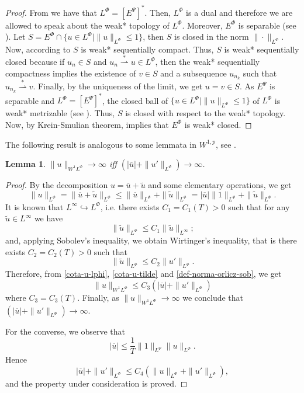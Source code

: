 \documentclass[twoside]{elsarticle}
\newtheorem{lem}[thm]{Lemma}
\theoremstyle{remark}
\newcommand{\orlnor}{\|_{L^{\Phi}}}
\newcommand{\lphi}{L^{\Phi}}
\newcommand{\lpsi}{L^{\Psi}}
\newcommand{\ephi}{E^{\Phi}}
\newcommand{\sobnor}{\|_{W^{1}\lphi}}
\renewcommand{\leq}{\leqslant}
\newcommand{\epsi}{E^{\Psi}}
\begin{document}
\begin{proof}
From \cite[Thm. 7, p. 110]{rao1991theory} we have that $\lphi=\left[\epsi\right]^*
$.
Then, $\lphi$ is a dual and therefore we are allowed to speak about the weak* topology of $\lphi$.
Moreover, $\ephi
$ is separable (see \cite[Thm. 1, p. 87]{rao1991theory}).
Let $S=\ephi\cap \{u \in \lphi|\|u\orlnor\leq 1\}$, then $S$ is closed in the norm $\|\cdot\orlnor$.
Now, according to \cite[Cor. 5, p. 148]{rao1991theory} $S$ is weak* sequentially compact.
Thus, $S$ is weak* sequentially closed because if $u_n\in S$ and
$u_n \overset{*}{\rightharpoonup}u \in \lphi$, then  the weak* sequentially compactness implies the existence of $v \in S$ and a subsequence $u_{n_k}$ such that
$u_{n_k}\overset{*}{\rightharpoonup}v$. Finally, by the uniqueness of   the limit, we get
$u=v\in S$.
As $\epsi$ is separable and $\lphi=\left[\epsi\right]^*$, the closed ball of $\{u \in \lphi | \|u\orlnor\leq 1\}$ of $\lphi$  is  weak* metrizable (see \cite[Thm. 5.1, p. 138]{Conway1977}).
Thus, $S$ is closed with respect to  the weak* topology. Now, by  Krein-Smulian theorem, \cite[Cor. 12.6, p. 165]{Conway1977} implies that $\ephi$ is weak* closed.
\end{proof}

The following result is analogous to some lemmata in $W^{1,p}$, see \cite[Lem. 1]{xu2007some}.
\begin{lem}\label{infinito-a-prom-upunto}
 $\|u\sobnor\to \infty$ iff  $(|\overline{u}|+\|u'\orlnor)\to \infty$.
\end{lem}

\begin{proof}
By the decomposition $u=\overline{u}+\tilde{u}$ and some elementary operations,
we get
\begin{equation}\label{cota-u-lphi}
\|u\orlnor=
\|\overline{u}+\tilde{u}\orlnor\leq
\|\overline{u}\orlnor+\|\tilde{u}\orlnor=
|\overline{u}|\|1\orlnor+\|\tilde{u}\orlnor.
\end{equation}
It is known that $L^{\infty}\hookrightarrow\lphi$, i.e.
there exists $C_1=C_1(T)>0$ such that for any $\tilde{u}\in L^{\infty}$ we have
\[
\|\tilde{u}\orlnor
\leq
C_1 \|\tilde{u}\|_{L^{\infty}};
\]
and, applying  Sobolev's inequality,  we obtain Wirtinger's inequality,
that is there exists $C_2=C_2(T)>0$ such that
\begin{equation}\label{cota-u-tilde}
\|\tilde{u}\orlnor
\leq
C_2\|u'\orlnor.
\end{equation}
Therefore, from \eqref{cota-u-lphi}, \eqref{cota-u-tilde} and \eqref{def-norma-orlicz-sob},
we get
\[
\|u\sobnor\leq
C_3(|\overline{u}|+\|u'\orlnor)
\]
where $C_3=C_3(T)$. Finally, as $\|u\sobnor\to \infty$ we conclude that
$(|\overline{u}|+\|u'\orlnor)\to \infty$.

For the converse, we observe that
\[|\overline{u}|\leq \frac{1}{T}\|1\|_{\lpsi}\|u\orlnor.\]
Hence
\[|\overline{u}| +\|u'\orlnor\leq C_4(\|u\orlnor +\|u'\orlnor),\]
and the property under consideration is proved.
\end{proof}
\end{document}
